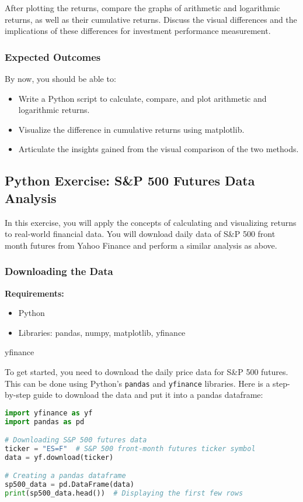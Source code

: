 \documentclass{article}
\begin{document}
After plotting the returns, compare the graphs of arithmetic and logarithmic returns, as well as their cumulative returns. Discuss the visual differences and the implications of these differences for investment performance measurement.

\subsubsection{Expected Outcomes}

By now, you should be able to:
\begin{itemize}
    \item Write a Python script to calculate, compare, and plot arithmetic and logarithmic returns.
    \item Visualize the difference in cumulative returns using matplotlib.
    \item Articulate the insights gained from the visual comparison of the two methods.
\end{itemize}

\subsection{Python Exercise: S\&P 500 Futures Data Analysis}

In this exercise, you will apply the concepts of calculating and visualizing returns to real-world financial data. You will download daily data of S\&P 500 front month futures from Yahoo Finance and perform a similar analysis as above.

\subsubsection{Downloading the Data}

\textbf{Requirements:}
\begin{itemize}
    \item Python
    \item Libraries: pandas, numpy, matplotlib, yfinance
\end{itemize}
yfinance

To get started, you need to download the daily price data for S\&P 500 futures. This can be done using Python's \texttt{pandas} and \texttt{yfinance} libraries. Here is a step-by-step guide to download the data and put it into a pandas dataframe:

\begin{lstlisting}[language=Python]
import yfinance as yf
import pandas as pd

# Downloading S&P 500 futures data
ticker = "ES=F"  # S&P 500 front-month futures ticker symbol
data = yf.download(ticker)

# Creating a pandas dataframe
sp500_data = pd.DataFrame(data)
print(sp500_data.head())  # Displaying the first few rows
\end{lstlisting}
\end{document}
